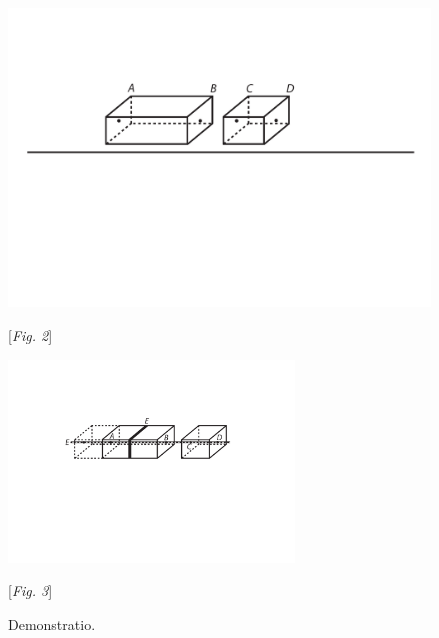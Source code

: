\begin{center}
\includegraphics[width=0.84\textwidth]{images/lh03703_162r-d2.pdf}\\
\rule[0pt]{0pt}{0pt}[\textit{Fig. 2}]
\end{center}
\pend
\vspace{1.5em}
\pstart
\begin{center}
\includegraphics[width=0.57\textwidth]{images/lh03703_162r-d3.pdf}\\
\rule[0pt]{0pt}{0pt}[\textit{Fig. 3}]
\end{center}
\pend
\vspace{1.5em}
\pstart \centering Demonstratio. 
\pend 
\vspace{0.5em} 
